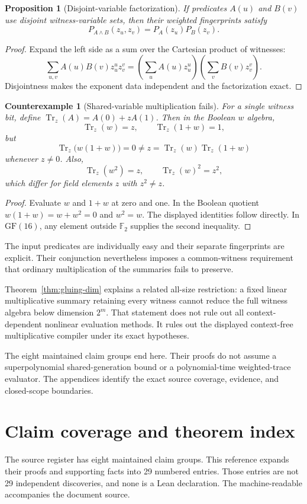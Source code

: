 \documentclass[11pt,letterpaper,oneside]{report}
\theoremstyle{komorebi}
\newtheorem{proposition}[theorem]{Proposition}
\newtheorem{counterexample}[theorem]{Counterexample}
\newcommand{\F}{\mathbb F_2}
\newcommand{\KTr}{\operatorname{Tr}}
\newcommand{\pathref}[1]{\texttt{\small\detokenize{#1}}}
\begin{document}
\begin{proposition}[Disjoint-variable factorization]\label{prop:disjoint}
If predicates $A(u)$ and $B(v)$ use disjoint witness-variable sets, then their weighted fingerprints satisfy
\[
 P_{A\land B}(z_u,z_v)=P_A(z_u)P_B(z_v).
\]
\end{proposition}
\begin{proof}
Expand the left side as a sum over the Cartesian product of witnesses:
\[
 \sum_{u,v}A(u)B(v)z_u^uz_v^v
 =\left(\sum_uA(u)z_u^u\right)
  \left(\sum_vB(v)z_v^v\right).
\]
Disjointness makes the exponent data independent and the factorization exact.
\end{proof}

\begin{counterexample}[Shared-variable multiplication fails]\label{ce:overlap}
For a single witness bit, define $\KTr_z(A)=A(0)+zA(1)$. Then in the Boolean $w$ algebra,
\[
 \KTr_z(w)=z,\qquad \KTr_z(1+w)=1,
\]
but
\[
 \KTr_z\bigl(w(1+w)\bigr)=0
 \ne z=\KTr_z(w)\KTr_z(1+w)
\]
whenever $z\ne0$. Also,
\[
 \KTr_z(w^2)=z,\qquad\KTr_z(w)^2=z^2,
\]
which differ for field elements $z$ with $z^2\ne z$.
\end{counterexample}
\begin{proof}
Evaluate $w$ and $1+w$ at zero and one. In the Boolean quotient $w(1+w)=w+w^2=0$ and $w^2=w$. The displayed identities follow directly. In $\mathrm{GF}(16)$, any element outside $\F$ supplies the second inequality.
\end{proof}

The input predicates are individually easy and their separate fingerprints are explicit. Their conjunction nevertheless imposes a common-witness requirement that ordinary multiplication of the summaries fails to preserve.

Theorem~\ref{thm:gluing-dim} explains a related all-size restriction: a fixed linear multiplicative summary retaining every witness cannot reduce the full witness algebra below dimension $2^m$. That statement does not rule out all context-dependent nonlinear evaluation methods. It rules out the displayed context-free multiplicative compiler under its exact hypotheses.

The eight maintained claim groups end here. Their proofs do not assume a superpolynomial shared-generation bound or a polynomial-time weighted-trace evaluator. The appendices identify the exact source coverage, evidence, and closed-scope boundaries.

\appendix
\chapter{Claim coverage and theorem index}
\label{app:index}
The source register has eight maintained claim groups. This reference expands their proofs and supporting facts into 29 numbered entries. Those entries are not 29 independent discoveries, and none is a Lean declaration. The machine-readable \pathref{theorem-map.json} accompanies the document source.
\end{document}
